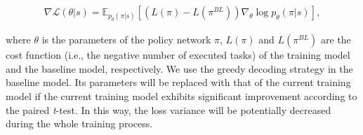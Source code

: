 \documentclass[lettersize,journal]{IEEEtran}
\begin{document}
	\begin{small}
		\begin{equation}\label{loss}
			\begin{array}{cc}
				\nabla \mathcal{L}\left( \theta |s \right)={{\mathbb{E}}_{{{p}_{\theta }}(\pi |s)}}[(L(\pi )-L({{\pi }^{BL}})){{\nabla }_{\theta }}\log {{p}_{\theta }}(\pi |s)],
			\end{array}
		\end{equation}
	\end{small}
	where $\theta $ is the parameters of the policy network $\pi $, $L(\pi )$ and $L({{\pi }^{BL}})$ are the cost function (i.e., the negative number of executed tasks) of the training model and the baseline model, respectively. We use the greedy decoding strategy in the baseline model. Its parameters will be replaced with that of the current training model if the current training model exhibits significant improvement according to the paired \textit{t}-test. In this way, the loss variance will be potentially decreased during the whole training process. 
	
\end{document}
